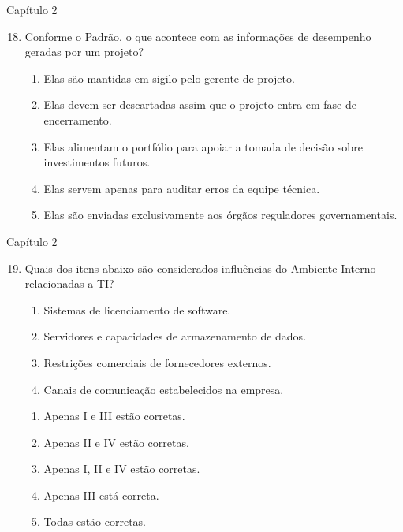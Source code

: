 \documentclass{beamer}
\begin{document}
\begin{frame}{Capítulo 2}
	\begin{enumerate}
		\setcounter{enumi}{17}
		\justifying
		\item Conforme o Padrão, o que acontece com as informações de desempenho geradas por um projeto?
		\begin{enumerate}[a]
			\justifying
			\item Elas são mantidas em sigilo pelo gerente de projeto.
			\item Elas devem ser descartadas assim que o projeto entra em fase de encerramento.
			\item \alert<2>{Elas alimentam o portfólio para apoiar a tomada de decisão sobre investimentos futuros}.
			\item Elas servem apenas para auditar erros da equipe técnica.
			\item Elas são enviadas exclusivamente aos órgãos reguladores governamentais.
		\end{enumerate}
	\end{enumerate}
\end{frame}

\begin{frame}{Capítulo 2}
	\begin{enumerate}
		\setcounter{enumi}{18}
		\justifying
		\item Quais dos itens abaixo são considerados influências do Ambiente Interno relacionadas a TI?
		
		\begin{enumerate}[I]
			\item Sistemas de licenciamento de software.
			\item Servidores e capacidades de armazenamento de dados.
			\item Restrições comerciais de fornecedores externos.
			\item Canais de comunicação estabelecidos na empresa.
		\end{enumerate}
		
		\vspace{10pt}
		\begin{enumerate}[a]
			\item Apenas I e III estão corretas.
			\item Apenas II e IV estão corretas.
			\item \alert<2>{Apenas I, II e IV estão corretas}.
			\item Apenas III está correta.
			\item Todas estão corretas.
		\end{enumerate}
	\end{enumerate}
\end{frame}
\end{document}
